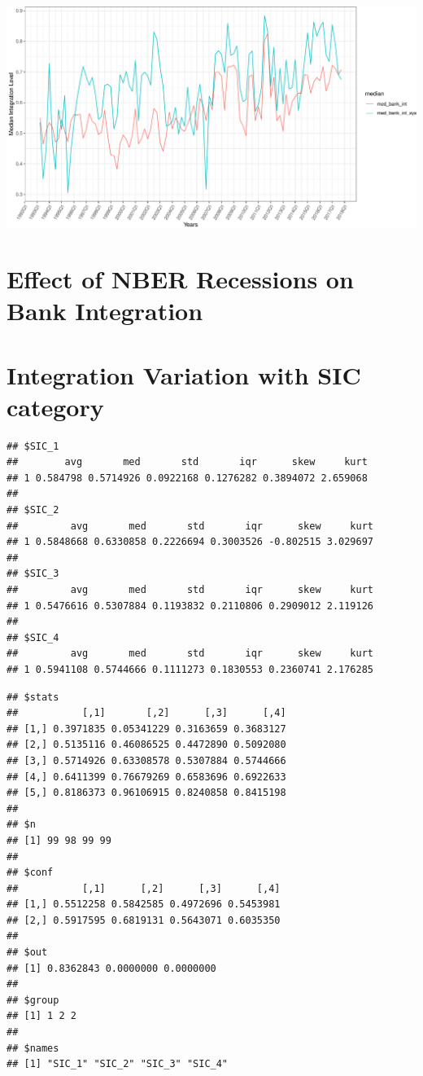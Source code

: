 \documentclass[11pt,]{article}
\begin{document}
\begin{center}\includegraphics{AC_US_Bank_Int_Results_1_files/figure-latex/systemic-1} \end{center}

\section{Effect of NBER Recessions on Bank
Integration}\label{effect-of-nber-recessions-on-bank-integration}

\section{Integration Variation with SIC
category}\label{integration-variation-with-sic-category}

\begin{verbatim}
## $SIC_1
##        avg       med       std       iqr      skew     kurt
## 1 0.584798 0.5714926 0.0922168 0.1276282 0.3894072 2.659068
## 
## $SIC_2
##         avg       med       std       iqr      skew     kurt
## 1 0.5848668 0.6330858 0.2226694 0.3003526 -0.802515 3.029697
## 
## $SIC_3
##         avg       med       std       iqr      skew     kurt
## 1 0.5476616 0.5307884 0.1193832 0.2110806 0.2909012 2.119126
## 
## $SIC_4
##         avg       med       std       iqr      skew     kurt
## 1 0.5941108 0.5744666 0.1111273 0.1830553 0.2360741 2.176285
\end{verbatim}

\begin{verbatim}
## $stats
##           [,1]       [,2]      [,3]      [,4]
## [1,] 0.3971835 0.05341229 0.3163659 0.3683127
## [2,] 0.5135116 0.46086525 0.4472890 0.5092080
## [3,] 0.5714926 0.63308578 0.5307884 0.5744666
## [4,] 0.6411399 0.76679269 0.6583696 0.6922633
## [5,] 0.8186373 0.96106915 0.8240858 0.8415198
## 
## $n
## [1] 99 98 99 99
## 
## $conf
##           [,1]      [,2]      [,3]      [,4]
## [1,] 0.5512258 0.5842585 0.4972696 0.5453981
## [2,] 0.5917595 0.6819131 0.5643071 0.6035350
## 
## $out
## [1] 0.8362843 0.0000000 0.0000000
## 
## $group
## [1] 1 2 2
## 
## $names
## [1] "SIC_1" "SIC_2" "SIC_3" "SIC_4"
\end{verbatim}
\end{document}
